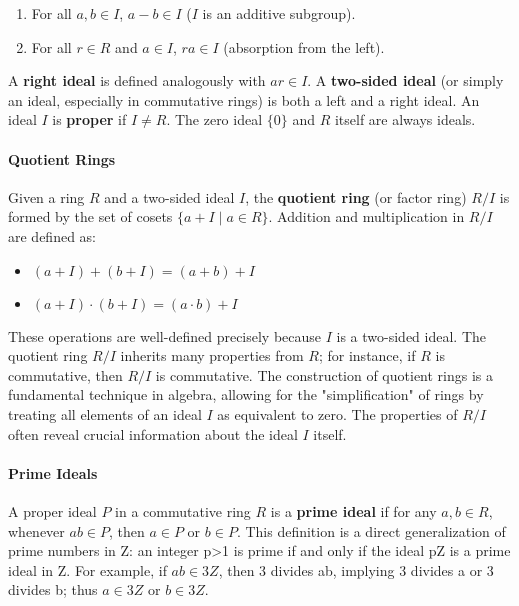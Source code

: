 \documentclass[12pt]{article}
\theoremstyle{definition}
\numberwithin{equation}{subsection}
\begin{document}
\begin{enumerate}
  \item For all $a,b\in I$, $a-b\in I$ ($I$ is an additive subgroup).
  \item For all $r\in R$ and $a\in I$, $ra\in I$ (absorption from the left).
\end{enumerate}

A \textbf{right ideal} is defined analogously with $ar\in I$. A \textbf{two-sided ideal} (or simply an ideal, especially in commutative rings) is both a left and a right ideal. An ideal $I$ is \textbf{proper} if $I\neq R$. The zero ideal $\{0\}$ and $R$ itself are always ideals.

\paragraph{Quotient Rings}
Given a ring $R$ and a two-sided ideal $I$, the \textbf{quotient ring} (or factor ring) $R/I$ is formed by the set of cosets $\{a+I\mid a\in R\}$. Addition and multiplication in $R/I$ are defined as:

\begin{itemize}
  \item $(a+I)+(b+I)=(a+b)+I$
  \item $(a+I)\cdot(b+I)=(a\cdot b)+I$
\end{itemize}

These operations are well-defined precisely because $I$ is a two-sided ideal. The quotient ring $R/I$ inherits many properties from $R$; for instance, if $R$ is commutative, then $R/I$ is commutative. The construction of quotient rings is a fundamental technique in algebra, allowing for the "simplification" of rings by treating all elements of an ideal $I$ as equivalent to zero. The properties of $R/I$ often reveal crucial information about the ideal $I$ itself.

\paragraph{Prime Ideals} 

A proper ideal $P$ in a commutative ring $R$ is a \textbf{prime ideal} if for any $a,b \in R$, whenever $ab \in P$, then $a \in P$ or $b \in P$. This definition is a direct generalization of prime numbers in Z: an integer p>1 is prime if and only if the ideal pZ is a prime ideal in Z. For example, if $ab \in 3Z$, then 3 divides ab, implying 3 divides a or 3 divides b; thus $a \in 3Z$ or $b \in 3Z$.   
\end{document}

